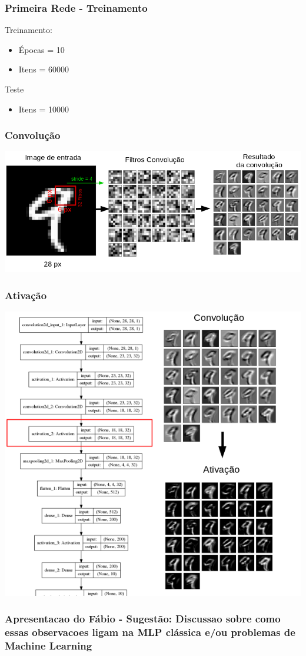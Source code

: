\documentclass[tikz,11pt]{beamer}
\begin{document}
\begin{frame}
	\frametitle{Primeira Rede - Treinamento}
	\centering
	\begin{minipage}{.5\textwidth}
		\centering
		\par Treinamento:
		\begin{itemize}
			\item Épocas = 10
			\item Itens = 60000
		\end{itemize}		
	\end{minipage}%
	\begin{minipage}{.5\textwidth}
	\centering
	\par Teste
	\begin{itemize}
		\item Itens = 10000
	\end{itemize}		
\end{minipage}%

\end{frame}

\begin{frame}
	\frametitle{Convolução}
	\centering
	\includegraphics[width=.8\paperwidth]{images/fabio/conv_1}
\end{frame}

\begin{frame}
	\frametitle{Ativação}
	\centering
	\includegraphics[height=.8\paperheight]{images/fabio/ativ_1}
\end{frame}


\begin{frame}
	\frametitle{Apresentacao do Fábio - Sugestão: Discussao sobre
		como essas observacoes ligam na MLP clássica e/ou problemas de
		Machine Learning}
\end{frame}
\end{document}
